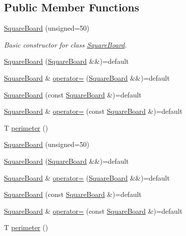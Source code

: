 \subsection*{Public Member Functions}
\begin{DoxyCompactItemize}
\item 
\mbox{\hyperlink{classSquareBoard_aa7aac1a02a00ce9ad0c9441fffa71e02}{Square\+Board}} (unsigned=50)
\begin{DoxyCompactList}\small\item\em Basic constructor for class \mbox{\hyperlink{classSquareBoard}{Square\+Board}}. \end{DoxyCompactList}\item 
\mbox{\hyperlink{classSquareBoard_a23c495a2419aded87c0b2803de409b5e}{Square\+Board}} (\mbox{\hyperlink{classSquareBoard}{Square\+Board}} \&\&)=default
\item 
\mbox{\hyperlink{classSquareBoard}{Square\+Board}} \& \mbox{\hyperlink{classSquareBoard_a354794a6de9edec8c771ca49dd315acf}{operator=}} (\mbox{\hyperlink{classSquareBoard}{Square\+Board}} \&\&)=default
\item 
\mbox{\hyperlink{classSquareBoard_a9a6c27e98ae10d6cb601140ef6a3ff59}{Square\+Board}} (const \mbox{\hyperlink{classSquareBoard}{Square\+Board}} \&)=default
\item 
\mbox{\hyperlink{classSquareBoard}{Square\+Board}} \& \mbox{\hyperlink{classSquareBoard_a15fd0ca02b5be393b75228123be1d2c8}{operator=}} (const \mbox{\hyperlink{classSquareBoard}{Square\+Board}} \&)=default
\item 
T \mbox{\hyperlink{classSquareBoard_a8b2ae6ea7295b2bff171b3d6311a456c}{perimeter}} ()
\item 
\mbox{\hyperlink{classSquareBoard_aa7aac1a02a00ce9ad0c9441fffa71e02}{Square\+Board}} (unsigned=50)
\item 
\mbox{\hyperlink{classSquareBoard_a23c495a2419aded87c0b2803de409b5e}{Square\+Board}} (\mbox{\hyperlink{classSquareBoard}{Square\+Board}} \&\&)=default
\item 
\mbox{\hyperlink{classSquareBoard}{Square\+Board}} \& \mbox{\hyperlink{classSquareBoard_a354794a6de9edec8c771ca49dd315acf}{operator=}} (\mbox{\hyperlink{classSquareBoard}{Square\+Board}} \&\&)=default
\item 
\mbox{\hyperlink{classSquareBoard_a9a6c27e98ae10d6cb601140ef6a3ff59}{Square\+Board}} (const \mbox{\hyperlink{classSquareBoard}{Square\+Board}} \&)=default
\item 
\mbox{\hyperlink{classSquareBoard}{Square\+Board}} \& \mbox{\hyperlink{classSquareBoard_a15fd0ca02b5be393b75228123be1d2c8}{operator=}} (const \mbox{\hyperlink{classSquareBoard}{Square\+Board}} \&)=default
\item 
T \mbox{\hyperlink{classSquareBoard_a8b2ae6ea7295b2bff171b3d6311a456c}{perimeter}} ()
\end{DoxyCompactItemize}
